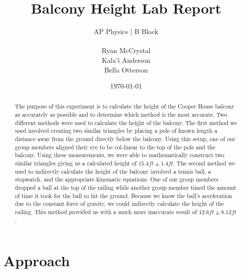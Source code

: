 \documentclass[12pt]{article}
\begin{document}
    
\title{Balcony Height Lab Report}
\author{AP Physics | B Block\\
	\\
	Ryan McCrystal\\
	Kala'i Anderson\\
Bella Otterson}
\date{\today}
\maketitle
\newpage
\begin{abstract} %
	The purpose of this experiment is to calculate the height of the Cooper House balcony as accurately as possible and to determine which method is the most accurate. Two different methods were used to calculate the height of the balcony. The first method we used involved creating two similar triangles by placing a pole of known length a distance away from the ground directly below the balcony. Using this setup, one of our group members aligned their eye to be col-linear to the top of the pole and the balcony. Using these measurements, we were able to mathematically construct two similar triangles giving us a calculated height of $15.4ft\pm1.4ft$. The second method we used to indirectly calculate the height of the balcony involved a tennis ball, a stopwatch, and the appropriate kinematic equations. One of our group members dropped a ball at the top of the railing while another group member timed the amount of time it took for the ball to hit the ground. Because we know the ball's acceleration due to the constant force of gravity, we could indirectly calculate the height of the railing. This method provided us with a much more inaccurate result of  $12.6ft\pm8.12ft$. 
\end{abstract}
\newpage
    
\section{Approach} %
\end{document}
